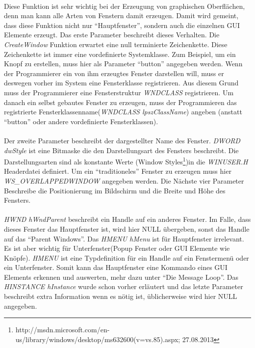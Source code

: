 \paragraph{}
Diese Funktion ist sehr wichtig bei der Erzeugung von graphischen Oberflächen, denn man kann alle Arten von Fenstern damit erzeugen. Damit wird gemeint, dass diese Funktion  nicht nur "`Hauptfenster"', sondern auch die einzelnen GUI Elemente erzeugt. Das erste Parameter beschreibt dieses Verhalten. Die \textit{CreateWindow} Funktion erwartet eine null terminierte Zeichenkette. Diese Zeichenkette ist immer eine vordefinierte Systemklasse. Zum Beispiel, um ein Knopf zu erstellen, muss hier als Parameter "`button"' angegeben werden. Wenn der Programmierer ein von ihm erzeugtes Fenster darstellen will, muss er deswegen vorher im System eine Fensterklasse registrieren. Aus diesem Grund muss der Programmierer eine Fensterstruktur \textit{WNDCLASS} registrieren. Um danach ein selbst gebautes Fenster zu erzeugen, muss der Programmieren das registrierte Fensterklassenname(\textit{WNDCLASS lpszClassName}) angeben (anstatt "`button"' oder andere vordefinierte Fensterklassen).

\paragraph{}
Der zweite Parameter beschreibt der dargestellter Name des Fenster. \textit{DWORD dwStyle} ist eine Bitmaske die den Darstellungsart des Fensters beschreibt. Die Darstellungsarten sind als konstante Werte (Window Styles\footnote{http://msdn.microsoft.com/en-us/library/windows/desktop/ms632600(v=vs.85).aspx; 27.08.2013})in die \textit{WINUSER.H} Headerdatei definiert. Um ein "`traditioneles"' Fenster zu erzeugen muss hier \textit{WS\_OVERLAPPEDWINDOW} angegeben werden. Die Nächste vier Parameter Beschreibe die Positionierung im Bildschirm und die Breite und Höhe des Fensters. 

\paragraph{}
\textit{HWND hWndParent} beschreibt ein Handle auf ein anderes Fenster. Im Falle, dass dieses Fenster das Hauptfenster ist, wird hier NULL übergeben, sonst das Handle auf das "`Parent Windows"'. Das \textit{HMENU hMenu} ist für Hauptfenster irrelevant. Es ist aber wichtig für Unterfenster(Popup Fenster oder GUI Elemente wie Knöpfe). \textit{HMENU} ist eine Typdefinition für ein Handle auf ein Fenstermenü oder ein Unterfenster. Somit kann das Hauptfenster eine Kommando eines GUI Elements erkennen und auswerten, mehr dazu unter "`Die Message Loop"'. Das \textit{HINSTANCE hInstance} wurde schon vorher erläutert und das letzte Parameter beschreibt extra Information wenn es nötig ist, üblicherweise wird hier NULL angegeben.

